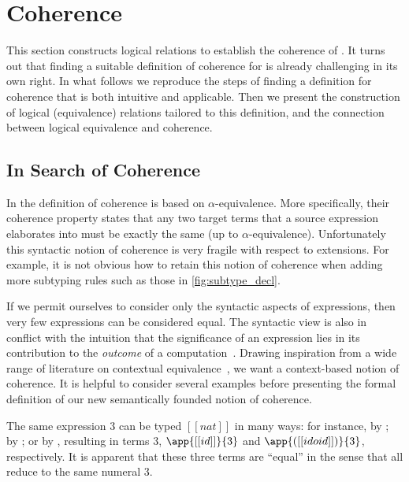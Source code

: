 
\section{Coherence}
\label{sec:cohe}

This section constructs logical relations to
establish the coherence of \name. It turns out that finding a
suitable definition of coherence for \name is already challenging in its own
right. In what follows we reproduce the steps of finding a definition for coherence
that is both intuitive and applicable. Then we present the
construction of logical (equivalence) relations tailored to this 
definition, and the connection between logical equivalence and coherence.



\subsection{In Search of Coherence}

In \oname the definition of coherence is based on
$\alpha$-equivalence. More specifically, their coherence property states that
any two target terms that a source expression elaborates into must be exactly the same (up to
$\alpha$-equivalence). Unfortunately this syntactic notion of coherence is
very fragile with respect to extensions.
For example, it is not obvious how to retain this notion of coherence when adding more subtyping
rules such as those in \cref{fig:subtype_decl}.

If we permit ourselves to consider only the syntactic aspects of expressions,
then very few expressions can be considered equal. The syntactic view is also in conflict
with the intuition that the significance of an expression lies in its
contribution to the \textit{outcome} of a computation~\cite{Harper_2016}.
Drawing inspiration from a wide range of literature on contextual
equivalence~\cite{morris1969lambda}, we want a context-based notion of
coherence. It is helpful to consider several examples before presenting the
formal definition of our new semantically founded notion of coherence.

\begin{example} \label{eg:1}
The same \name expression $3$ can be typed $[[nat]]$ in many ways: for instance, by ; by
; or by , resulting in \tname
terms $3$, $\app{[[id]]}{3}$ and $\app{([[id o id]])}{3}$, respectively. It is apparent
that these three \tname terms are ``equal'' in the sense that all reduce to the
same numeral $3$.
\end{example}

